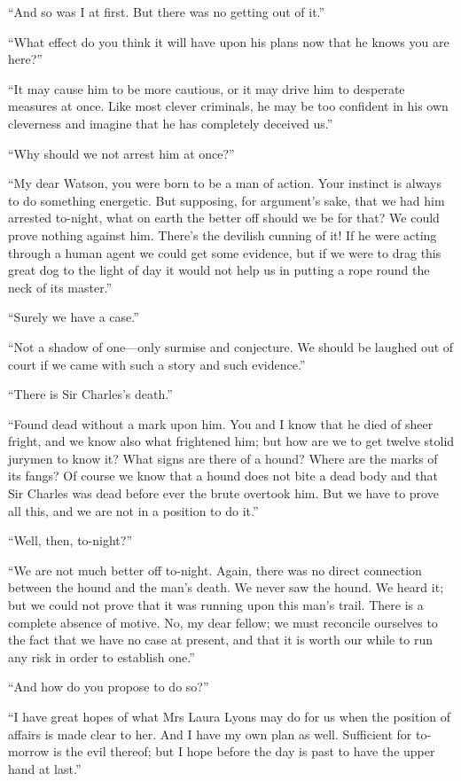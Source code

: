 \documentclass[paper=a5,BCOR=7mm,twoside,DIV=calc,12pt,usegeometry,openany,chapterprefix,endperiod,headings=big]{scrbook} %
\begin{document}
\enquote{And so was I at first. But there was no getting out of it.}

\enquote{What effect do you think it will have upon his plans now that he knows you are here?}

\enquote{It may cause him to be more cautious, or it may drive him to desperate measures at once. Like most clever criminals, he may be too confident in his own cleverness and imagine that he has completely deceived us.}

\enquote{Why should we not arrest him at once?}

\enquote{My dear Watson, you were born to be a man of action. Your instinct is always to do something energetic. But supposing, for argument's sake, that we had him arrested to-night, what on earth the better off should we be for that? We could prove nothing against him. There's the devilish cunning of it! If he were acting through a human agent we could get some evidence, but if we were to drag this great dog to the light of day it would not help us in putting a rope round the neck of its master.}

\enquote{Surely we have a case.}

\enquote{Not a shadow of one---only surmise and conjecture. We should be laughed out of court if we came with such a story and such evidence.}

\enquote{There is Sir Charles's death.}

\enquote{Found dead without a mark upon him. You and I know that he died of sheer fright, and we know also what frightened him; but how are we to get twelve stolid jurymen to know it? What signs are there of a hound? Where are the marks of its fangs? Of course we know that a hound does not bite a dead body and that Sir Charles was dead before ever the brute overtook him. But we have to prove all this, and we are not in a position to do it.}

\enquote{Well, then, to-night?}

\enquote{We are not much better off to-night. Again, there was no direct connection between the hound and the man's death. We never saw the hound. We heard it; but we could not prove that it was running upon this man's trail. There is a complete absence of motive. No, my dear fellow; we must reconcile ourselves to the fact that we have no case at present, and that it is worth our while to run any risk in order to establish one.}

\enquote{And how do you propose to do so?}

\enquote{I have great hopes of what Mrs Laura Lyons may do for us when the position of affairs is made clear to her. And I have my own plan as well. Sufficient for to-morrow is the evil thereof; but I hope before the day is past to have the upper hand at last.}
\end{document}
